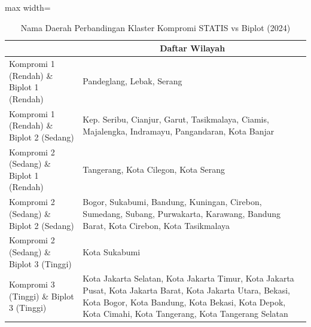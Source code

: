 \begin{table}[H]
\centering
\caption{Nama Daerah Perbandingan Klaster Kompromi STATIS vs Biplot (2024)} \label{tab:app1biplot_comp_name_2024}
\begin{adjustbox}{max width=\textwidth}
\begin{tabular}{|>{\centering\arraybackslash}p{4cm}|p{10cm}|}
\hline
\multicolumn{1}{|c|}{\textbf{Kategori}} & \multicolumn{1}{c|}{\textbf{Daftar Wilayah}} \\
\hline
Kompromi 1 (Rendah) \& Biplot 1 (Rendah) & Pandeglang, Lebak, Serang \\
\hline
Kompromi 1 (Rendah) \& Biplot 2 (Sedang) & Kep. Seribu, Cianjur, Garut, Tasikmalaya, Ciamis, Majalengka, Indramayu, Pangandaran, Kota Banjar \\
\hline
Kompromi 2 (Sedang) \& Biplot 1 (Rendah) & Tangerang, Kota Cilegon, Kota Serang \\
\hline
Kompromi 2 (Sedang) \& Biplot 2 (Sedang) & Bogor, Sukabumi, Bandung, Kuningan, Cirebon, Sumedang, Subang, Purwakarta, Karawang, Bandung Barat, Kota Cirebon, Kota Tasikmalaya \\
\hline
Kompromi 2 (Sedang) \& Biplot 3 (Tinggi) & Kota Sukabumi \\
\hline
Kompromi 3 (Tinggi) \& Biplot 3 (Tinggi) & Kota Jakarta Selatan, Kota Jakarta Timur, Kota Jakarta Pusat, Kota Jakarta Barat, Kota Jakarta Utara, Bekasi, Kota Bogor, Kota Bandung, Kota Bekasi, Kota Depok, Kota Cimahi, Kota Tangerang, Kota Tangerang Selatan \\
\hline
\end{tabular}
\end{adjustbox}
\end{table}